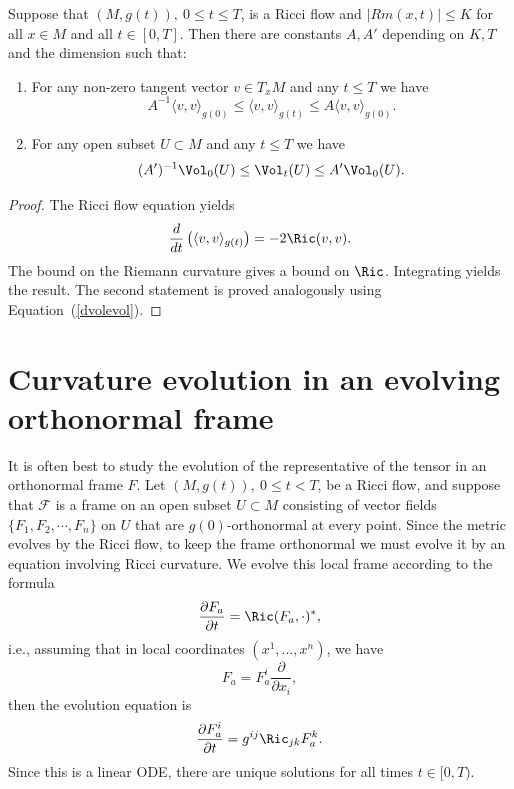 \begin{lemma}\label{lem:metric-volume-distortion}
Suppose that $(M,g(t)),\ 0\le t\le T$, is a Ricci flow and
$|Rm(x,t)|\le K$ for all $x\in M$ and all $t\in [0,T]$. Then there
are constants $A,A'$  depending on $K,T$ and the dimension such
that:
\begin{enumerate}
\item For any non-zero tangent vector $v\in T_xM$ and any $t\le T$ we have
$$A^{-1}\langle v,v\rangle_{g(0)}\le \langle v,v\rangle_{g(t)}\le A\langle
v,v\rangle_{g(0)}.$$
\item For any open subset $U\subset M$ and any $t\le T$ we have
$$(A')^{-1}\Vol_0(U)\le \Vol_t(U)\le A'\Vol_0(U).$$
\end{enumerate}
\end{lemma}

\begin{proof}
The Ricci flow equation yields
$$\frac{d}{dt}\left(\langle v,v\rangle_{g(t)}\right)=-2\Ric(v,v).$$
The bound on the Riemann curvature gives a bound on $\Ric$.
Integrating yields the result. The second statement is proved
analogously using Equation~(\ref{dvolevol}).
\end{proof}



\section{Curvature evolution in an evolving orthonormal
frame}\label{evolframe}


It is often best to study the evolution of the representative of the
tensor in an orthonormal frame $F$. Let $(M,g(t)),\ 0\le t<T$, be a
Ricci flow, and suppose that ${\mathcal F}$ is a frame on an open
subset $U\subset M$ consisting of vector fields $\{F_{1},
F_{2},\cdots,F_{n}\}$ on $U$ that are $g(0)$-orthonormal at every
point. Since the metric evolves by the Ricci flow, to keep the frame
orthonormal we must evolve it by an equation involving Ricci
curvature. We evolve this local frame  according to the formula
\begin{equation}\label{frameevol} \frac{\partial F_{a}}{\partial t}
= \Ric(F_{a},\cdot)^*,\end{equation} i.e.,  assuming that in local
coordinates $(x^1,\ldots,x^n)$, we have
\[ F_{a}=F^{i}_{a}\frac{\partial}{\partial x_{i}}, \]
then the evolution equation is
\[\frac{\partial F^{i}_{a}}{\partial t} = g^{ij}\Ric_{jk}F^{k}_{a}.\]
 Since this is a linear ODE, there are unique
solutions for all times $t\in [0,T)$.


